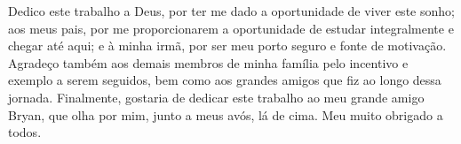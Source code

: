 Dedico este trabalho a Deus, por ter me dado a oportunidade de viver este sonho;
aos meus pais, por me proporcionarem a oportunidade de estudar integralmente e chegar até aqui;
e à minha irmã, por ser meu porto seguro e fonte de motivação.
Agradeço também aos demais membros de minha família pelo incentivo e exemplo a serem seguidos,
bem como aos grandes amigos que fiz ao longo dessa jornada.
Finalmente, gostaria de dedicar este trabalho ao meu grande amigo Bryan,
que olha por mim, junto a meus avós, lá de cima.
Meu muito obrigado a todos.
